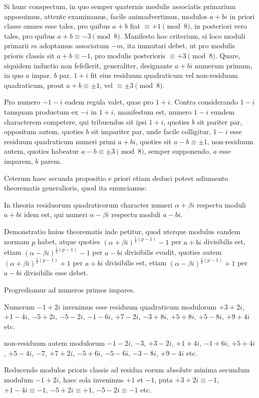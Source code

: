 Si hunc conspectum, in quo semper quaternis modulis associatis primarium apposuimus, attente examinamus, facile animadvertimus, modulos $a+bi$ in priori classe omnes esse tales, pro quibus $a+b$ fiat $\equiv+1\pmod8$, in posteriori vero tales, pro quibus $a+b\equiv-3\pmod8$. Manifesto hoc criterium, si loco moduli primarii $m$ adoptamus associatum $-m$, ita immutari debet, ut pro modulis prioris classis sit $a+b\equiv-1$, pro modulis posterioris $\equiv+3\pmod8$. Quare, siquidem inductio non fefellerit, generaliter, designante $a+bi$ numerum primum, in quo $a$ impar. $b$ par, $1+i$ fit eius residuum quadraticum vel non-residuum quadraticum, prout $a+b\equiv\pm1$, vel $\equiv\pm3\pmod8$.

Pro numero $-1-i$ eadem regula valet, quae pro $1+i$. Contra considerando $1-i$ tamquam productum ex $-i$ in $1+i$, manifestum est, numero $1-i$ eundem characterem competere, qui tribuendus sit ipsi $1+i$, quoties $b$ sit pariter par, oppositum autem, quoties $b$ sit impariter par, unde facile colligitur, $1-i$ esse residuum quadraticum numeri primi $a+bi$, quoties sit $a-b\equiv\pm1$, non-residuum autem, quoties habeatur $a-b\equiv\pm3\pmod8$, semper supponendo, $a$ esse imparem, $b$ parem.

Ceterum haec secunda propositio e priori etiam deduci potest adiumento theorematis generalioris, quod ita enunciamus:

%
In theoria residuorum quadraticorum character numeri $\alpha+\beta i$ respectu moduli $a+bi$ idem est, qui numeri $\alpha-\beta i$ respectu moduli $a-bi$.

Demonstratio huius theorematis inde petitur, quod uterque modulus eandem normam $p$ habet, atque quoties $(\alpha+\beta i)^{\frac12(p-1)}-1$ per $a+bi$ divisibilis est, etiam $(\alpha-\beta i)^{\frac12(p-1)}-1$ per $a-bi$ divisibilis evadit, quoties autem $(\alpha+\beta i)^{\frac12(p-1)}+1$ per $a+bi$ divisibilis est, etiam $(\alpha-\beta i)^{\frac12(p-1)}+1$ per $a-bi$ divisibilis esse debet.

Progrediamur ad numeros primos impares.

Numerum $-1+2i$ invenimus esse residuum quadraticum modulorum $+3+2i$, $+1-4i$, $-5+2i$, $-5-2i$, $-1-6i$, $+7-2i$, $-3+8i$, $+5+8i$, $+5-8i$, $+9+4i$ etc.

non-residuum autem modulorum $-1-2i$, $-3$, $+3-2i$, $+1+4i$, $-1+6i$, $+5+4i$, $+5-4i$, $-7$, $+7+2i$, $-5+6i$, $-5-6i$, $-3-8i$, $+9-4i$ etc.

Reducendo modulos prioris classis ad residua eorum absolute minima secundum modulum $-1+2i$, haec sola invenimus $+1$ et $-1$, puta $+3+2i\equiv-1$, $+1-4i\equiv-1$, $-5+2i\equiv+1$, $-5-2i\equiv-1$ etc.

